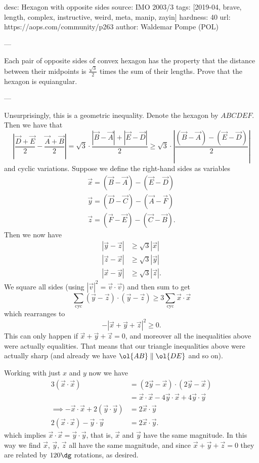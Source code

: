 desc: Hexagon with opposite sides
source: IMO 2003/3
tags: [2019-04, brave, length, complex, instructive, weird, meta, manip, zayin]
hardness: 40
url: https://aops.com/community/p263
author: Waldemar Pompe (POL)

---

Each pair of opposite sides of convex hexagon has the property that
the distance between their midpoints is $\frac{\sqrt3}{2}$
times the sum of their lengths.
Prove that the hexagon is equiangular.

---

Unsurprisingly, this is a geometric inequality.
Denote the hexagon by $ABCDEF$.
Then we have that
\[
  \left\lvert
  \frac{\vec D + \vec E}{2} - \frac{\vec A + \vec B}{2}
  \right\rvert
  = \sqrt3 \cdot \frac{\left\lvert \vec B - \vec A \right\rvert
    + \left\lvert \vec E - \vec D \right\rvert}{2}
  \ge \sqrt 3 \cdot
  \left\lvert \frac{(\vec B - \vec A) - (\vec E - \vec D)}{2}  \right\rvert
\]
and cyclic variations.
Suppose we define the right-hand sides as variables
\begin{align*}
  \vec x = (\vec B - \vec A) - (\vec E - \vec D) \\
  \vec y = (\vec D - \vec C) - (\vec A - \vec F) \\
  \vec z = (\vec F - \vec E) - (\vec C - \vec B).
\end{align*}
Then we now have
\begin{align*}
  \left\lvert \vec y - \vec z \right\rvert
  &\ge \sqrt 3 \left\lvert \vec x  \right\rvert \\
  \left\lvert \vec z - \vec x \right\rvert
  &\ge \sqrt 3 \left\lvert \vec y  \right\rvert \\
  \left\lvert \vec x - \vec y \right\rvert
  &\ge \sqrt 3 \left\lvert \vec z  \right\rvert.
\end{align*}
We square all sides (using
$\left\lvert \vec v \right\rvert^2 = \vec v \cdot \vec v$)
and then sum to get
\[ \sum_{\text{cyc}} (\vec y - \vec z) \cdot (\vec y - \vec z)
  \ge 3 \sum_{\text{cyc}} \vec x \cdot \vec x \]
which rearranges to
\[- \left\lvert \vec x + \vec y + \vec z \right\rvert^2 \ge 0. \]
This can only happen if $\vec x + \vec y + \vec z =0$,
and moreover all the inequalities above were actually equalities.
That means that our triangle inequalities above were actually sharp
(and already we have $\ol{AB} \parallel \ol{DE}$ and so on).

Working with just $x$ and $y$ now we have
\begin{align*}
  3 (\vec x \cdot \vec x) &= (2 \vec y - \vec x) \cdot (2 \vec y - \vec x) \\
  &= \vec x \cdot \vec x - 4 \vec y \cdot \vec x + 4 \vec y \cdot \vec y \\
  \implies
  -\vec x \cdot \vec x + 2 (\vec y \cdot \vec y) &= 2 \vec x \cdot \vec y \\
  2 (\vec x \cdot \vec x) - \vec y \cdot \vec y &= 2 \vec x \cdot \vec y.
\end{align*}
which implies $\vec x \cdot \vec x = \vec y \cdot \vec y$,
that is, $\vec x$ and $\vec y$ have the same magnitude.
In this way we find $\vec x$, $\vec y$, $\vec z$ all
have the same magnitude,
and since $\vec x + \vec y + \vec z = 0$
they are related by $120\dg$ rotations, as desired.

